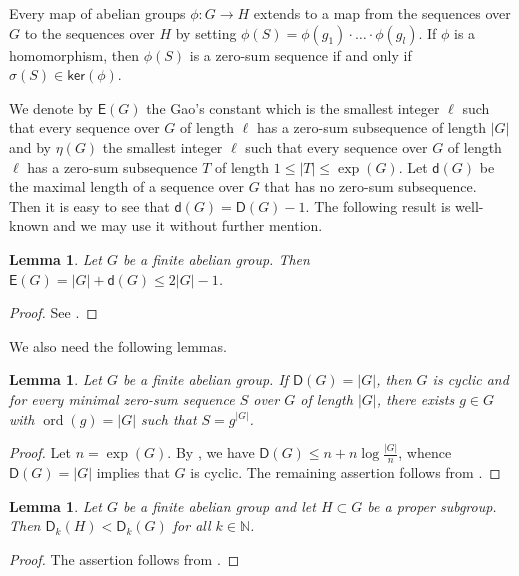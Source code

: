 \documentclass[11pt]{amsart}
\newtheorem{lemma}[theorem]{Lemma}
\theoremstyle{definition}
\newcommand{\N}{\mathbb N}
\DeclareMathOperator{\ord}{ord}
\numberwithin{equation}{section}
\begin{document}
Every map of abelian groups $\phi: G\rightarrow H$ extends to a map from the sequences over $G$ to the sequences over $H$ by setting $\phi(S)=\phi(g_1)\cdot \ldots \cdot \phi(g_l)$. If $\phi$ is a homomorphism, then $\phi(S)$ is a zero-sum sequence if and only if $\sigma(S)\in \mathsf{ker}(\phi)$.


We denote by $\mathsf E(G)$ the Gao's constant which is the smallest integer $\ell$ such that every sequence over $G$ of length $\ell$ has a zero-sum subsequence of length $|G|$ and by $\eta(G)$ the smallest integer $\ell$ such that every sequence over $G$ of length $\ell$ has a zero-sum subsequence $T$ of length $1\le |T|\le \exp(G)$. 
Let $\mathsf d(G)$ be the maximal length of a sequence over $G$ that has no zero-sum subsequence. Then it is easy to see that $\mathsf d(G)=\mathsf D(G)-1$.
The following result is well-known and we may use it without further mention.

\begin{lemma}\label{le-E}
	Let $G$ be a finite abelian group. Then $\mathsf E(G)=|G|+\mathsf d(G)\le 2|G|-1$.
 	\end{lemma}
\begin{proof}
	See \cite[Propositions 5.7.9.2 and 5.1.4.4]{Ger-book}.
\end{proof}

We also need the following lemmas.
\begin{lemma}\label{le-cyc}
	Let $G$ be a finite abelian group. If $\mathsf D(G)=|G|$, then $G$ is cyclic and for every minimal zero-sum sequence $S$ over $G$ of length $|G|$,  there exists $g\in G$ with $\ord(g)=|G|$ such that $S=g^{|G|}$.
\end{lemma}
\begin{proof}
	Let $n=\exp(G)$.
	By \cite[Theorem 5.5.5]{Gr-book}, we have $\mathsf D(G)\le n+n\log\frac{|G|}{n}$, whence $\mathsf D(G)=|G|$ implies that $G$ is cyclic. The remaining assertion follows from \cite[Theorem 5.1.10.1]{Ger-book}.
\end{proof}

\begin{lemma}\label{le-subgroup}
	Let $G$ be a finite abelian group and let $H\subset G$ be a proper subgroup. Then $\mathsf D_k(H)<\mathsf D_k(G)$ for all $k\in \N$.
\end{lemma}
\begin{proof}
	The assertion follows from \cite[Lemma 6.1.3]{Ger-book}.
\end{proof}
\end{document}
